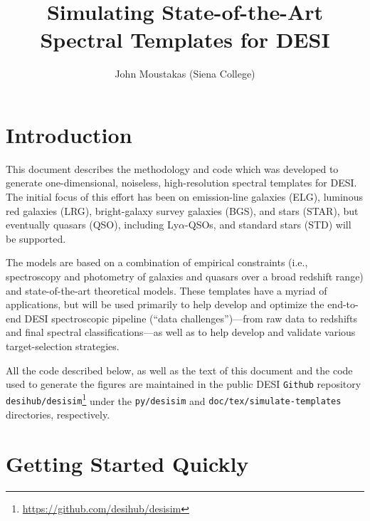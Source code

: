 \documentclass[11pt]{article}
\begin{document}
\title{Simulating State-of-the-Art Spectral Templates for DESI} 

\author{John Moustakas (Siena College)}
\maketitle


\section{Introduction}

This document describes the methodology and code which was developed to generate
one-dimensional, noiseless, high-resolution spectral templates for DESI.  The
initial focus of this effort has been on emission-line galaxies (ELG), luminous
red galaxies (LRG), bright-galaxy survey galaxies (BGS), and stars (STAR), but
eventually quasars (QSO), including Ly$\alpha$-QSOs, and standard stars (STD)
will be supported.

The models are based on a combination of empirical constraints (i.e.,
spectroscopy and photometry of galaxies and quasars over a broad redshift range)
and state-of-the-art theoretical models.  These templates have a myriad of
applications, but will be used primarily to help develop and optimize the
end-to-end DESI spectroscopic pipeline (``data challenges'')---from raw data to
redshifts and final spectral classifications---as well as to help develop and
validate various target-selection strategies.

All the code described below, as well as the text of this document and the code
used to generate the figures are maintained in the public DESI {\tt Github}
repository {\tt
  desihub/desisim}\footnote{\url{https://github.com/desihub/desisim}} under the
{\tt py/desisim} and {\tt doc/tex/simulate-templates} directories, respectively.


\section{Getting Started Quickly}
\end{document}
